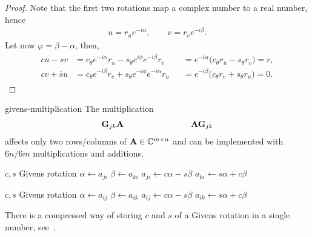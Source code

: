 \begin{proof}
  Note that the first two rotations map a complex number to a real number, hence
  \begin{gather}
    u = r_u e^{-i\alpha}, \qquad v = r_v e^{-i\beta}.
  \end{gather}
  Let now $\varphi = \beta-\alpha$, then,
  \begin{gather}
    \begin{aligned}
      c u - s v
      &= c_\theta e^{-i\alpha} r_u - s_\theta e^{i\phi} e^{-i\beta} r_v
      &&= e^{-i\alpha}\bigl(c_\theta r_u - s_\theta r_v\bigr) = r,
      \\
      c v + \overline s u
      &= c_\theta e^{-i\beta} r_v + s_\theta e^{-i\phi} e^{-i\alpha} r_u
      &&= e^{-i\beta}\bigl(c_\theta r_v + s_\theta r_u\bigr) = 0.      
    \end{aligned}
  \end{gather}
\end{proof}

\begin{Algorithm}{givens-multiplication}
  The multiplication
  \begin{gather}
    \mathbf G_{jk}\mathbf A\qquad\qquad\qquad\qquad \mathbf A\mathbf G_{jk}
  \end{gather}
  affects only two rows/columns of $\mathbf A\in\mathbb C^{m\times n}$ and can be
  implemented with $6n/6m$ multiplications and additions.

  \hrulefill
  \vspace*{2mm}
  
  \begin{minipage}{.49\textwidth}
    \begin{algorithmic}[1]
      \Require $c,s$ Givens rotation
      \State $\alpha \gets a_{ji}$
      \State $\beta \gets a_{ki}$
      \State $a_{ji} \gets c\alpha-s\beta$
      \State $a_{ki} \gets s\alpha+c\beta$
      \EndFor
    \end{algorithmic}      
  \end{minipage}
  \begin{minipage}{.49\textwidth}
    \begin{algorithmic}[1]
      \Require $c,s$ Givens rotation
      \State $\alpha \gets a_{ij}$
      \State $\beta \gets a_{ik}$
      \State $a_{ij} \gets c\alpha-s\beta$
      \State $a_{ik} \gets s\alpha+c\beta$
      \EndFor
    \end{algorithmic}      
  \end{minipage}
\end{Algorithm}

\begin{remark}
  There is a compressed way of storing $c$ and $s$ of a Givens rotation in a single number, see~\cite[5.1.11]{GolubVanLoan83}.
\end{remark}

